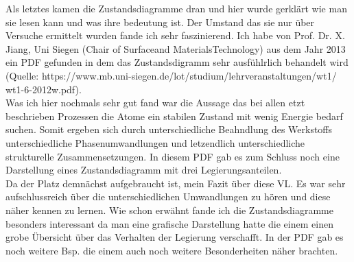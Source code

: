 \documentclass[12pt]{scrreprt}
\begin{document}
Als letztes kamen die Zustandsdiagramme dran und hier wurde gerklärt wie man sie lesen kann und was ihre bedeutung ist. Der Umstand das sie nur über Versuche ermittelt wurden fande ich sehr faszinierend. Ich habe von Prof. Dr. X. Jiang, Uni Siegen (Chair of Surfaceand MaterialsTechnology) aus dem Jahr 2013 ein PDF gefunden in dem das Zustandsdigramm sehr ausfühlrlich behandelt wird \\
(Quelle: https://www.mb.uni-siegen.de/lot/studium/lehrveranstaltungen/wt1/\\wt1-6-2012w.pdf).\\
Was ich hier nochmals sehr gut fand war die Aussage das bei allen etzt beschrieben Prozessen die Atome ein stabilen Zustand mit wenig Energie bedarf suchen. Somit ergeben sich durch unterschiedliche Beahndlung des Werkstoffs unterschiedliche Phasenumwandlungen und letzendlich unterschiedliche strukturelle Zusammensetzungen. In diesem PDF gab es zum Schluss noch eine Darstellung eines Zustandsdiagramm mit drei Legierungsanteilen.\\[0,3cm]
Da der Platz demnächst aufgebraucht ist, mein Fazit über diese VL. Es war sehr aufschlussreich über die unterschiedlichen Umwandlungen zu hören und diese näher kennen zu lernen. Wie schon erwähnt fande ich die Zustandsdiagramme besonders interessant da man eine grafische Darstellung hatte die einem einen grobe Übersicht über das Verhalten der Legierung verschafft. In der PDF gab es noch weitere Bsp. die einem auch noch weitere Besonderheiten näher brachten.
 
\end{document}
